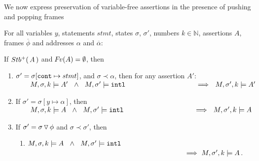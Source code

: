 \vspace{.2cm}

We now express preservation of variable-free assertions in the presence of pushing and popping frames
 
\begin{lemma}
\label{l:push:pop}
For all   variables $y$, statements $stmt$, states $\sigma$, $\sigma'$, numbers $k\in \mathbb{N}$, assertions  $A$,
 frames $\overline {\phi}$ %
and addresses $\alpha$ and $\overline \alpha$: %


\noindent
If ${Stb^+(\, A\, )}$ and ${\hspace{-1pt}F\hspace{-1pt}}v(A)=\emptyset$, then


\begin{enumerate}

\item
\label{pp:l:same:one}
$\sigma'=\sigma[\mbox{\normalfont{\texttt{cont}}}\mapsto stmt]$,   and $\sigma \prec \alpha$, then for any assertion $A'$:\\
$\strut \ \   \ \ \ \ \satDAssertFrom M  \sigma k   A' \ \ \wedge\ \ M, \sigma' \models \intThis  \strut \hspace{3.6cm}  \Longrightarrow  \ \ \satDAssertFrom M  {\sigma'} k   A' $


\item
\label{pp:l:same:two}
If $\sigma'=\sigma[y \mapsto \alpha]$,   then \\
$\strut \ \   \ \ \ \ \satDAssertFrom M  \sigma k   A \ \ \wedge\ \ M, \sigma' \models \intThis  \strut \hspace{3.6cm}  \Longrightarrow  \ \ \satDAssertFrom M  {\sigma'} k   A $

\item
\label{pp:l:push}
If $\sigma'=\sigma  \, {\triangledown}\, \phi$   and $\sigma \prec \sigma'$, then
\begin{enumerate}
\item
\label{pp:l:one}
$M,\sigma ,{k} \models {A}  \ \ \wedge \  \ M, \sigma' \models \mbox{\normalfont{\texttt{intl}}} $ \\
$\strut \hspace{8cm} \Longrightarrow\   \satDAssertFrom M  {\sigma'} k   A $.


\end{enumerate}
\end{enumerate}
\end{lemma}
